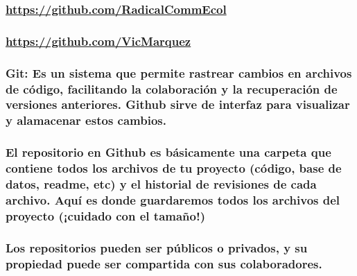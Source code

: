 \documentclass[
]{article}
\begin{document}
\subsubsection{\texorpdfstring{\url{https://github.com/RadicalCommEcol}}{https://github.com/RadicalCommEcol}}\label{httpsgithub.comradicalcommecol}

\subsubsection{\texorpdfstring{\url{https://github.com/VicMarquez}}{https://github.com/VicMarquez}}\label{httpsgithub.comvicmarquez}

\subsubsection{\texorpdfstring{\textbf{Git}: Es un sistema que permite
rastrear cambios en archivos de código, facilitando la colaboración y la
recuperación de versiones anteriores. Github sirve de interfaz para
visualizar y alamacenar estos
cambios.}{Git: Es un sistema que permite rastrear cambios en archivos de código, facilitando la colaboración y la recuperación de versiones anteriores. Github sirve de interfaz para visualizar y alamacenar estos cambios.}}\label{git-es-un-sistema-que-permite-rastrear-cambios-en-archivos-de-cuxf3digo-facilitando-la-colaboraciuxf3n-y-la-recuperaciuxf3n-de-versiones-anteriores.-github-sirve-de-interfaz-para-visualizar-y-alamacenar-estos-cambios.}

\newpage

\subsubsection{El repositorio en Github es básicamente una carpeta que
contiene todos los archivos de tu proyecto (código, base de datos,
readme, etc) y el historial de revisiones de cada archivo. Aquí es donde
guardaremos todos los archivos del proyecto (¡cuidado con el
tamaño!)}\label{el-repositorio-en-github-es-buxe1sicamente-una-carpeta-que-contiene-todos-los-archivos-de-tu-proyecto-cuxf3digo-base-de-datos-readme-etc-y-el-historial-de-revisiones-de-cada-archivo.-aquuxed-es-donde-guardaremos-todos-los-archivos-del-proyecto-cuidado-con-el-tamauxf1o}

\subsubsection{Los repositorios pueden ser públicos o privados, y su
propiedad puede ser compartida con sus
colaboradores.}\label{los-repositorios-pueden-ser-puxfablicos-o-privados-y-su-propiedad-puede-ser-compartida-con-sus-colaboradores.}
\end{document}
